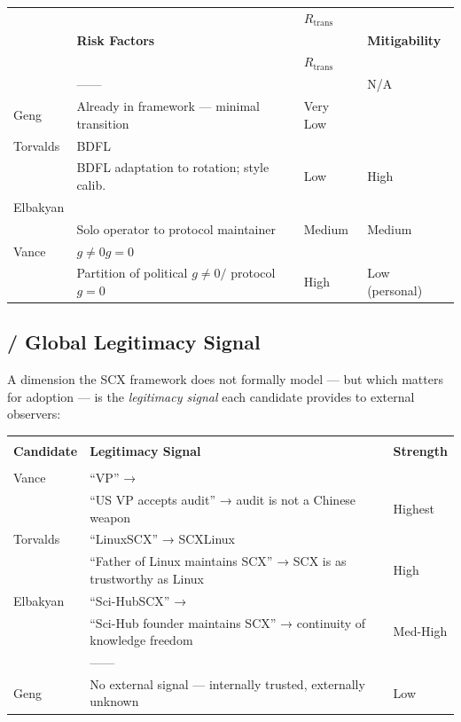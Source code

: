 \documentclass[12pt,a4paper]{article}
\theoremstyle{remark}
\begin{document}
\begin{center}
\begin{longtable}{p{} p{} p{} p{}}
\toprule
\textbf{} & \textbf{} & \textbf{$R_{\text{trans}}$} & \textbf{} \\
& \textbf{Risk Factors} & & \textbf{Mitigability} \\
\midrule
\endfirsthead
\toprule
\textbf{} & \textbf{} & \textbf{$R_{\text{trans}}$} & \textbf{} \\
\midrule
\endhead
\bottomrule
\endfoot
\midrule
 & —— &  & N/A \\
Geng & Already in framework — minimal transition & Very Low & \\
\midrule
Torvalds & BDFL &  &  \\
& BDFL adaptation to rotation; style calib. & Low & High \\
\midrule
Elbakyan &  &  &  \\
& Solo operator to protocol maintainer & Medium & Medium \\
\midrule
Vance & $g \neq 0$$g=0$ &  &  \\
& Partition of political $g \neq 0 /$ protocol $g=0$ & High & Low (personal) \\
\bottomrule
\end{longtable}
\end{center}

\subsection{ / Global Legitimacy Signal}

A dimension the SCX framework does not formally model — but which matters
for adoption — is the \textit{legitimacy signal} each candidate provides
to external observers:

\begin{center}
\begin{longtable}{p{} p{} p{}}
\toprule
\textbf{} & \textbf{} & \textbf{} \\
\textbf{Candidate} & \textbf{Legitimacy Signal} & \textbf{Strength} \\
\midrule
\endfirsthead
\toprule
\textbf{} & \textbf{} & \textbf{} \\
\midrule
\endhead
\bottomrule
\endfoot
\midrule
Vance & ``VP'' →  &  \\
& ``US VP accepts audit'' → audit is not a Chinese weapon & Highest \\
\midrule
Torvalds & ``LinuxSCX'' → SCXLinux &  \\
& ``Father of Linux maintains SCX'' → SCX is as trustworthy as Linux & High \\
\midrule
Elbakyan & ``Sci-HubSCX'' →  &  \\
& ``Sci-Hub founder maintains SCX'' → continuity of knowledge freedom & Med-High \\
\midrule
 & —— &  \\
Geng & No external signal — internally trusted, externally unknown & Low \\
\bottomrule
\end{longtable}
\end{center}
\end{document}
